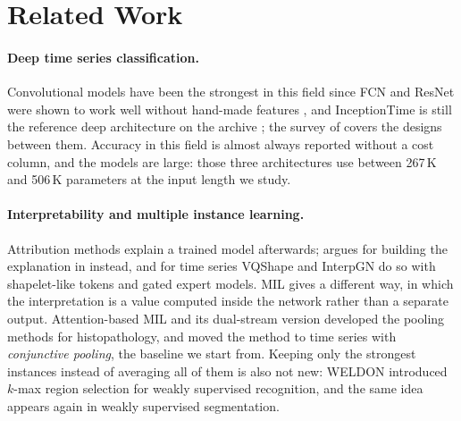 %

\section{Related Work}
\label{sec:related}

\paragraph{Deep time series classification.}
Convolutional models have been the strongest in this field since FCN and ResNet were shown to work
well without hand-made features \citep{wang2017fcn}, and InceptionTime \citep{fawaz2020inceptiontime}
is still the reference deep architecture on the \ucr{} archive \citep{dau2019ucr}; the survey of
\citet{fawaz2019review} covers the designs between them. Accuracy in this field is almost always
reported without a cost column, and the models are large: those three architectures use between
267\,K and 506\,K parameters at the input length we study.

\paragraph{Interpretability and multiple instance learning.}
Attribution methods \citep{ribeiro2016lime, lundberg2017shap, sundararajan2017ig} explain a trained
model afterwards; \citet{rudin2019stop} argues for building the explanation in instead, and for time
series VQShape \citep{wen2024vqshape} and InterpGN \citep{wen2025interpgn} do so with shapelet-like
tokens and gated expert models. MIL \citep{dietterich1997mil} gives a different way, in which the
interpretation is a value computed inside the network rather than a separate output. Attention-based
MIL \citep{ilse2018attention} and its dual-stream version \citep{li2021dsmil} developed the pooling
methods for histopathology, and \millet{} \citep{early2024millet} moved the method to time series
with \emph{conjunctive pooling}, the baseline we start from. Keeping only the strongest instances
instead of averaging all of them is also not new: WELDON \citep{durand2016weldon} introduced $k$-max
region selection for weakly supervised recognition, and the same idea appears again in weakly
supervised segmentation.


